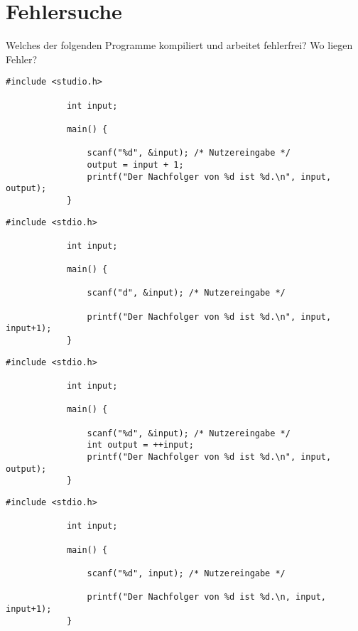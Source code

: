 \documentclass[]{article}
\begin{document}
	
	\section{Fehlersuche}
	
	Welches der folgenden Programme kompiliert und arbeitet fehlerfrei? Wo liegen Fehler?
	\vspace{3ex}
	
	\noindent
	\begin{minipage}{0.5\linewidth} %
		\begin{lstlisting}[gobble=6]
			#include <studio.h>
			
			int input;
			
			main() {
			
				scanf("%d", &input); /* Nutzereingabe */
				output = input + 1;
				printf("Der Nachfolger von %d ist %d.\n", input, output);
			}
		\end{lstlisting}
	\end{minipage}
	\quad
	\begin{minipage}{0.5\linewidth} %
		\begin{lstlisting}[gobble=6]
			#include <stdio.h>
			
			int input;
			
			main() {
			
				scanf("d", &input); /* Nutzereingabe */
				
				printf("Der Nachfolger von %d ist %d.\n", input, input+1);
			}
		\end{lstlisting}
	\end{minipage}
	\begin{minipage}{0.5\linewidth} %
		\begin{lstlisting}[gobble=6]
			#include <stdio.h>
			
			int input;
			
			main() {
			
				scanf("%d", &input); /* Nutzereingabe */
				int output = ++input;
				printf("Der Nachfolger von %d ist %d.\n", input, output);
			}
		\end{lstlisting}
	\end{minipage}
	\quad
	\begin{minipage}{0.5\linewidth} %
		\begin{lstlisting}[gobble=6]
			#include <stdio.h>
			
			int input;
			
			main() {
			
				scanf("%d", input); /* Nutzereingabe */
				
				printf("Der Nachfolger von %d ist %d.\n, input, input+1);
			}
		\end{lstlisting}
	\end{minipage}
\end{document}
